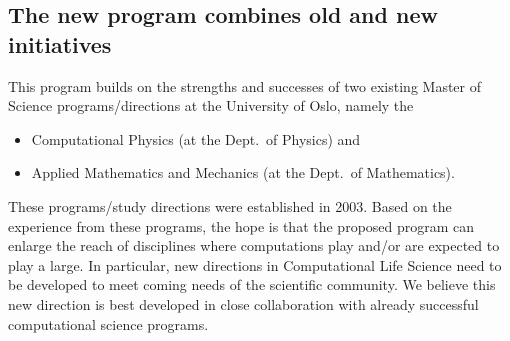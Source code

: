 \documentclass[%
oneside,                 %
final,                   %
10pt]{article}
\begin{document}
\subsection{The new program combines old and new initiatives}
\begin{block}{}

This program builds on the strengths and successes of two existing Master of Science programs/directions at the University of Oslo, namely the 
\begin{itemize}
 \item Computational Physics (at the Dept.~of Physics) and

 \item Applied Mathematics and Mechanics (at the Dept.~of Mathematics).
\end{itemize}

\noindent
These programs/study directions  were established in 2003.
Based on the experience from these programs, the hope is that the proposed program can enlarge the reach of disciplines where computations play and/or are expected to play  a large. In particular, new directions 
in Computational Life Science need to  be developed to
meet coming needs of the scientific community. We believe this new direction is
best developed in close collaboration with already successful
computational science programs.  


\end{block}


\end{document}
